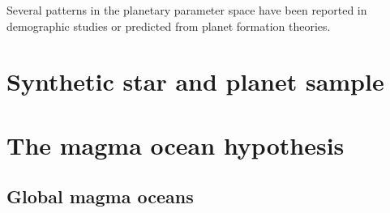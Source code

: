 \documentclass[twocolumn]{aastex631}
\begin{document}
%
%



Several patterns in the planetary parameter space have been reported in demographic studies or predicted from planet formation theories.


\section{Synthetic star and planet sample}

\section{The magma ocean hypothesis}

\subsection{Global magma oceans}
\end{document}
